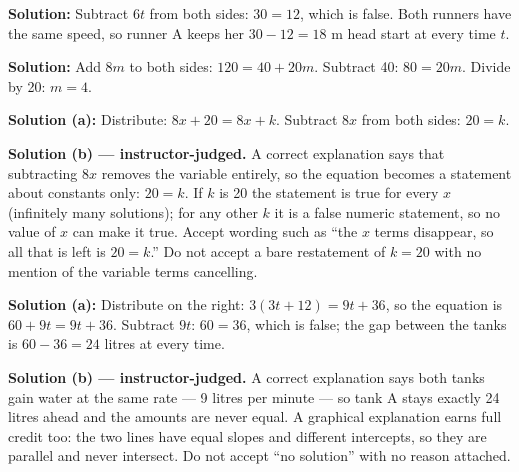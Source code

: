 \documentclass[12pt]{article}
\begin{document}

\textbf{Solution:} Subtract $6t$ from both sides: $30 = 12$, which is false.
Both runners have the same speed, so runner A keeps her $30 - 12 = 18$ m head
start at every time $t$. 


\textbf{Solution:} Add $8m$ to both sides: $120 = 40 + 20m$. Subtract 40:
$80 = 20m$. Divide by 20: $m = 4$. 


\textbf{Solution (a):} Distribute: $8x + 20 = 8x + k$. Subtract $8x$ from both
sides: $20 = k$. 

\textbf{Solution (b) --- instructor-judged.} A correct explanation says that
subtracting $8x$ removes the variable entirely, so the equation becomes a
statement about constants only: $20 = k$. If $k$ is 20 the statement is true
for every $x$ (infinitely many solutions); for any other $k$ it is a false
numeric statement, so no value of $x$ can make it true. Accept wording such as
``the $x$ terms disappear, so all that is left is $20 = k$.'' Do not accept a
bare restatement of $k = 20$ with no mention of the variable terms cancelling.


\textbf{Solution (a):} Distribute on the right: $3(3t + 12) = 9t + 36$, so the
equation is $60 + 9t = 9t + 36$. Subtract $9t$: $60 = 36$, which is false; the
gap between the tanks is $60 - 36 = 24$ litres at every time.

\textbf{Solution (b) --- instructor-judged.} A correct explanation says both
tanks gain water at the same rate --- 9 litres per minute --- so tank A stays
exactly 24 litres ahead and the amounts are never equal. A graphical
explanation earns full credit too: the two lines have equal slopes and
different intercepts, so they are parallel and never intersect. Do not accept
``no solution'' with no reason attached.
\end{document}
